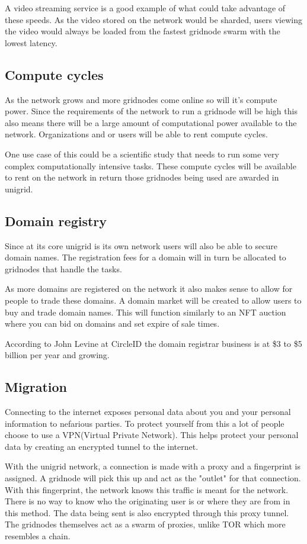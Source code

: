 \documentclass[12pt]{article}
\begin{document}
A video streaming service is a good example of what could take advantage of these speeds. As the video stored on the network would be sharded, users viewing the video would always be loaded from the fastest gridnode swarm with the lowest latency.
   

\subsection*{Compute cycles}
As the network grows and more gridnodes come online so will it's compute power. Since the requirements of the network to run a gridnode will be high this also means there will be a large amount of computational power available to the network. Organizations and or users will be able to rent compute cycles. 

One use case of this could be a scientific study that needs to run some very complex computationally intensive tasks. These compute cycles will be available to rent on the network in return those gridnodes being used are awarded in unigrid.

\subsection*{Domain registry}
Since at its core unigrid is its own network users will also be able to secure domain names. The registration fees for a domain will in turn be allocated to gridnodes that handle the tasks.

As more domains are registered on the network it also makes sense to allow for people to trade these domains. A domain market will be created to allow users to buy and trade domain names. This will function similarly to an NFT auction where you can bid on domains and set expire of sale times.

According to John Levine at CircleID \cite{john2018} the domain registrar business is at \$3 to \$5 billion per year and growing.


\subsection*{Migration }
Connecting to the internet exposes personal data about you and your personal information to nefarious parties. To protect yourself from this a lot of people choose to use a VPN(Virtual Private Network). This helps protect your personal data by creating an encrypted tunnel to the internet.

With the unigrid network, a connection is made with a proxy and a fingerprint is assigned. A gridnode will pick this up and act as the "outlet" for that connection. With this fingerprint, the network knows this traffic is meant for the network. There is no way to know who the originating user is or where they are from in this method. The data being sent is also encrypted through this proxy tunnel. The gridnodes themselves act as a swarm of proxies, unlike TOR which more resembles a chain.
\end{document}
